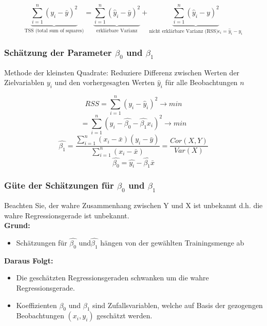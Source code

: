 \[ \underbrace{\sum\limits_{i=1}^n (y_i - \bar{y})^2}_{\text{TSS (total sum of squares)}} = \underbrace{\sum\limits_{i=1}^n (\hat{y}_i - \bar{y})^2}_{\text{erklärbare Varianz}} + \underbrace{\sum\limits_{i=1}^n (\hat{y}_i - y)^2}_{\text{nicht erklärbare Varianz (RSS)} \epsilon_i = \hat{y}_i -y_i} \]

\subsubsection{Schätzung der Parameter $\beta_0$ und $\beta_1$}
Methode der kleinsten Quadrate: Reduziere Differenz zwischen Werten der Zielvariablen $y_i$ und den vorhergesagten Werten $\hat{y}_i$ für alle Beobachtungen $n$

\[ RSS = \sum\limits_{i=1}^n (y_i -\hat{y}_i)^2 \rightarrow min \]
\[ = \sum\limits_{i=1}^n (y_i -\hat{\beta_0} - \hat{\beta_1} x_i)^2 \rightarrow min \]
\[ \hat{\beta_1} = \frac{\sum\limits_{i=1}^n(x_i - \bar{x})(y_i - \bar{y})}{\sum\limits_{i=1}^n(x_i - \bar{x})} = 
\frac{Cor(X,Y)}{Var(X)} \]
\[ \hat{\beta_0} = \hat{y_i} - \hat{\beta_1}\bar{x} \]
	
\subsubsection{Güte der Schätzungen für $\beta_0$ und $\beta_1$}
Beachten Sie, der wahre Zusammenhang zwischen Y und X ist unbekannt d.h. die wahre Regressionsgerade ist unbekannt. \\
\textbf{Grund:} 
\begin{itemize}
	\item Schätzungen für $\hat{\beta_0}$ und$ \hat{\beta_1}$ hängen von der gewählten Trainingsmenge ab\\
\end{itemize}
\textbf{Daraus Folgt:} 
\begin{itemize}
	\item Die geschätzten Regressionsgeraden schwanken um die wahre Regressionsgerade.
	\item Koeffizienten $\beta_0$ und $\beta_1$ sind Zufallsvariablen, welche auf Basis der gezogengen Beobachtungen $(x_i,y_i)$ geschätzt werden.
\end{itemize}






